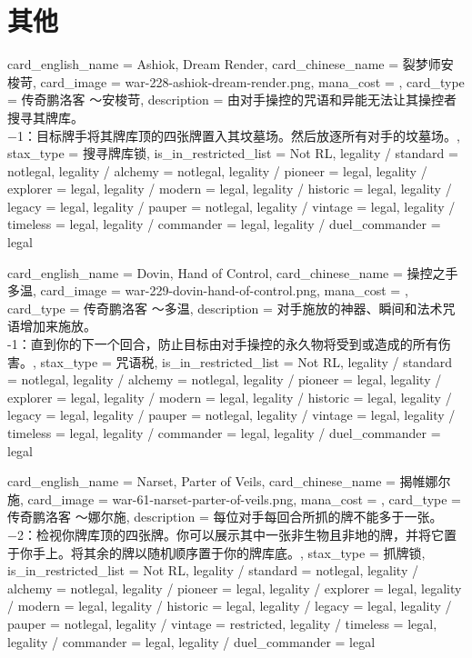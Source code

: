 \documentclass[lang = cn, color = black, 10pt]{AllThatStax}
\begin{document}
\section{其他}

\card
{
	card_english_name = {Ashiok, Dream Render},
	card_chinese_name = {裂梦师安梭苛},
	card_image = war-228-ashiok-dream-render.png,
	mana_cost = ,
	card_type = 传奇鹏洛客 ～安梭苛,
	description = {由对手操控的咒语和异能无法让其操控者搜寻其牌库。\\
		−1：目标牌手将其牌库顶的四张牌置入其坟墓场。然后放逐所有对手的坟墓场。},
	stax_type = 搜寻牌库锁,
	is_in_restricted_list = Not RL,
	legality / standard = notlegal,
	legality / alchemy = notlegal,
	legality / pioneer = legal,
	legality / explorer = legal,
	legality / modern = legal,
	legality / historic = legal,
	legality / legacy = legal,
	legality / pauper = notlegal,
	legality / vintage = legal,
	legality / timeless = legal,
	legality / commander = legal,
	legality / duel_commander = legal
}

\card
{
	card_english_name = {Dovin, Hand of Control},
	card_chinese_name = {操控之手多温},
	card_image = war-229-dovin-hand-of-control.png,
	mana_cost = ,
	card_type = 传奇鹏洛客 ～多温,
	description = {对手施放的神器、瞬间和法术咒语增加来施放。\\
		-1：直到你的下一个回合，防止目标由对手操控的永久物将受到或造成的所有伤害。},
	stax_type = 咒语税,
	is_in_restricted_list = Not RL,
	legality / standard = notlegal,
	legality / alchemy = notlegal,
	legality / pioneer = legal,
	legality / explorer = legal,
	legality / modern = legal,
	legality / historic = legal,
	legality / legacy = legal,
	legality / pauper = notlegal,
	legality / vintage = legal,
	legality / timeless = legal,
	legality / commander = legal,
	legality / duel_commander = legal
}

\card
{
	card_english_name = {Narset, Parter of Veils},
	card_chinese_name = {揭帷娜尔施},
	card_image = war-61-narset-parter-of-veils.png,
	mana_cost = ,
	card_type = 传奇鹏洛客 ～娜尔施,
	description = {每位对手每回合所抓的牌不能多于一张。\\
		−2：检视你牌库顶的四张牌。你可以展示其中一张非生物且非地的牌，并将它置于你手上。将其余的牌以随机顺序置于你的牌库底。},
	stax_type = 抓牌锁,
	is_in_restricted_list = Not RL,
	legality / standard = notlegal,
	legality / alchemy = notlegal,
	legality / pioneer = legal,
	legality / explorer = legal,
	legality / modern = legal,
	legality / historic = legal,
	legality / legacy = legal,
	legality / pauper = notlegal,
	legality / vintage = restricted,
	legality / timeless = legal,
	legality / commander = legal,
	legality / duel_commander = legal
}
\end{document}
